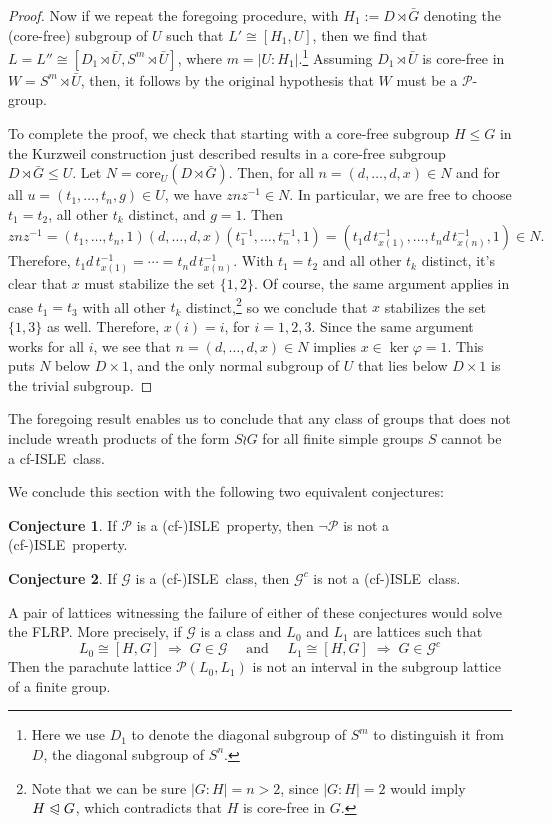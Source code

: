 \documentclass[cm,dissertation,actual,final]{uhthesis}
\theoremstyle{plain}
\theoremstyle{definition}
\newcounter{conjecture}
\newtheorem{conjecture}[conjecture]{Conjecture}
\theoremstyle{remark}
\numberwithin{theorem}{section}
\numberwithin{claim}{chapter}
\numberwithin{equation}{section}
\numberwithin{conjecture}{chapter}
\newcommand{\<}{\ensuremath{\langle}}
\renewcommand{\>}{\ensuremath{\rangle}}
\renewcommand{\leq}{\ensuremath{\leqslant}}
\newcommand{\subnormal}{\ensuremath{\trianglelefteqslant}}
\newcommand{\core}{\ensuremath{\mathrm{core}}}
\newcommand{\FLRP}{{\small FLRP}}
\newcommand{\0}{\ensuremath{\mathbf{0}}}
\newcommand{\1}{\ensuremath{\mathbf{1}}}
\newcommand{\2}{\ensuremath{\mathbf{2}}}
\newcommand{\3}{\ensuremath{\mathbf{3}}}
\newcommand{\4}{\ensuremath{\mathbf{4}}}
\newcommand{\5}{\ensuremath{\mathbf{5}}}
\newcommand{\sG}{\ensuremath{\mathscr{G}}}
\newcommand{\sP}{\ensuremath{\mathscr{P}}}
\newcommand{\cP}{\ensuremath{\mathcal{P}}}
\newcommand{\solvable}{\ensuremath{\mathfrak{S}}}
\newcommand{\ISLE}{{\small ISLE}}
\renewcommand{\phi}{\ensuremath{\varphi}}
\begin{document}
\begin{proof}
  Now if we repeat the foregoing procedure, with $H_1 := D\rtimes \bar{G}$ denoting the
  (core-free) subgroup of $U$ such that $L' \cong [H_1, U]$, then we find that
  $L = L''\cong [D_1\rtimes \bar{U}, S^m\rtimes
    \bar{U}]$, where $m = |U:H_1|$.\footnote{Here we use $D_1$ to denote the
    diagonal subgroup of $S^m$ to distinguish it from $D$, the diagonal subgroup
    of $S^n$.} 
 Assuming $D_1\rtimes \bar{U}$ is core-free in $W = S^m\rtimes \bar{U}$, then, 
it follows by the original hypothesis that $W$ must be a $\cP$-group.

  To complete the proof, we check that starting with a core-free subgroup
  $H \leq G$ in the Kurzweil construction just described results in a
  core-free subgroup $D\rtimes \bar{G} \leq U$.   Let $N = \core_U(D\rtimes
  \bar{G})$.  Then, for all $n=(d,\dots, d, x) \in N$ and for all 
  $u = (t_1,\dots, t_n, g)\in U$, we have $znz^{-1}\in N$.  In particular, we
  are free to choose
  $t_1 = t_2$, all other $t_k$ distinct, and $g=1$.  Then 
  \[
  zn z^{-1} = (t_1,\dots, t_n, 1) (d, \dots, d, x) (t_1^{-1},\dots, t_n^{-1}, 1)
  =(t_1 d \,t_{x(1)}^{-1},\dots, t_nd \,t_{x(n)}^{-1}, 1) \in N.\]
  Therefore, $t_1 d\, t_{x(1)}^{-1} = \cdots = t_nd \,t_{x(n)}^{-1}$. With $t_1 = t_2$
  and all other $t_k$ distinct, it's clear that $x$ must stabilize the set $\{1,2\}$.
  Of course, the same argument applies in case $t_1 = t_3$ with all other $t_k$
  distinct,\footnote{Note that we can be sure $|G:H| = n > 2$, since $|G:H|=2$
    would imply $H\subnormal G$, which contradicts that $H$ is core-free in $G$.}
  so we conclude that $x$ stabilizes the set $\{1, 3\}$ as well.  Therefore, $x(i)
  = i$, for $i=1, 2, 3$.  Since the same argument works for all $i$, we see that
  $n=(d,\dots,d, x) \in N$ implies $x\in \ker \phi = 1$.  This puts $N$ below
  $D\times 1$, and the only normal subgroup of $U$ that lies 
  below $D\times 1$ is the trivial subgroup.
\end{proof}
The foregoing result enables us to conclude that any class of groups that does
not include wreath products of the form $S\wr G$ for all finite simple groups
$S$ cannot be a cf-\ISLE\ class. %

\vskip2mm

We conclude this section with the following two equivalent conjectures:
\begin{conjecture}
\label{conjecture:isle-prop}
  If $\cP$ is a (cf-)\ISLE\ property, then $\neg \cP$ is not a (cf-)\ISLE\ property.
\end{conjecture}
\begin{conjecture}
\label{conjecture:isle-prop2}
If $\sG$ is a (cf-)\ISLE\ class, then $\sG^c$ is not a (cf-)\ISLE\ class.
\end{conjecture}
\noindent A pair of lattices witnessing the failure of either of these conjectures 
would solve the \FLRP.  More precisely, if $\sG$ is a class and $L_0$ and $L_1$ are
lattices such that 
\[
L_0 \cong [H, G] \; \Rightarrow \; G\in \sG \quad \text{ and } \quad
L_1 \cong [H, G] \; \Rightarrow \; G\in \sG^c
\]
Then the parachute lattice $\sP(L_0, L_1)$ is not an interval in the subgroup
lattice of a finite group.
\end{document}
